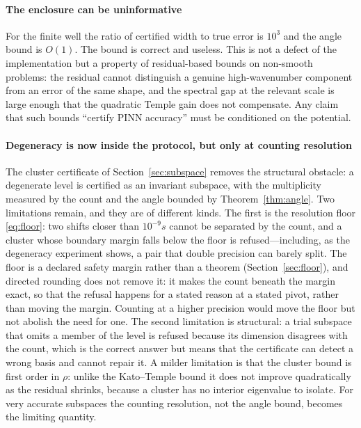 \paragraph{The enclosure can be uninformative} For the finite well the ratio
of certified width to true error is $10^{3}$ and the angle bound is $O(1)$.
The bound is correct and useless. This is not a defect of the implementation
but a property of residual-based bounds on non-smooth problems: the residual
cannot distinguish a genuine high-wavenumber component from an error of the
same shape, and the spectral gap at the relevant scale is large enough that
the quadratic Temple gain does not compensate. Any claim that such bounds
``certify PINN accuracy'' must be conditioned on the potential.

\paragraph{Degeneracy is now inside the protocol, but only at counting
resolution} The cluster certificate of Section~\ref{sec:subspace} removes the
structural obstacle: a degenerate level is certified as an invariant subspace,
with the multiplicity measured by the count and the angle bounded by
Theorem~\ref{thm:angle}. Two limitations remain, and they are of different
kinds. The first is the resolution floor \eqref{eq:floor}: two shifts closer
than $10^{-9}s$ cannot be separated by the count, and a cluster whose boundary
margin falls below the floor is refused---including, as the degeneracy
experiment shows, a pair that double precision can barely split. The floor is
a declared safety margin rather than a theorem (Section~\ref{sec:floor}), and
directed rounding does not remove it: it makes the count beneath the margin
exact, so that the refusal happens for a stated reason at a stated pivot,
rather than moving the margin. Counting at a higher precision would move the
floor but not abolish the need for one. The second limitation is structural: a
trial subspace that omits a member of the level is refused because its
dimension disagrees with the count, which is the correct answer but means that
the certificate can detect a wrong basis and cannot repair it. A milder
limitation is that the cluster bound is first order in $\rho$: unlike the
Kato--Temple bound it does not improve quadratically as the residual shrinks,
because a cluster has no interior eigenvalue to isolate. For very accurate
subspaces the counting resolution, not the angle bound, becomes the limiting
quantity.

